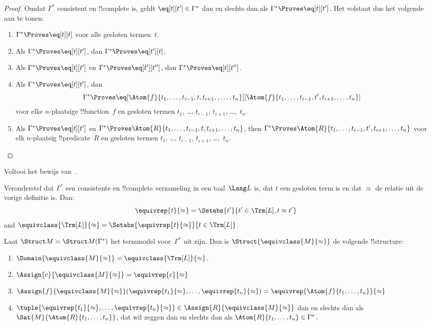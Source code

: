 \documentclass[../../../include/open-logic-section]{subfiles}
\begin{document}
\begin{proof}
Omdat $\Gamma^*$ consistent en !!{complete} is, geldt
$\eq[t][t'] \in \Gamma^*$ dan en slechts dan als
$\Gamma^* \Proves \eq[t][t']$. Het volstaat dus het volgende aan te tonen:
\begin{enumerate}
\item $\Gamma^* \Proves \eq[t][t]$ voor alle gesloten termen~$t$.
\item Als $\Gamma^* \Proves \eq[t][t']$, dan $\Gamma^* \Proves \eq[t'][t]$.
\item Als $\Gamma^* \Proves \eq[t][t']$ en $\Gamma^* \Proves
  \eq[t'][t'']$, dan $\Gamma^* \Proves \eq[t][t'']$.
\item Als $\Gamma^* \Proves \eq[t][t']$, dan
\[
\Gamma^* \Proves
\eq[\Atom{f}{t_1,\dots,t_{i-1},t,t_{i+1},,\dots,t_n}][\Atom{f}{t_1,\dots,t_{i-1},t',t_{i+1},\dots,t_n}]
\]
voor elke $n$-plaatsige !!{function}~$f$ en gesloten termen $t_1$, \dots,
$t_{i-1}$, $t_{i+1}$, \dots,~$t_n$.
\item Als $\Gamma^* \Proves \eq[t][t']$ en
$\Gamma^* \Proves
\Atom{R}{t_1,\dots,t_{i-1},t,t_{i+1},\dots,t_n}$, then
$\Gamma^* \Proves \Atom{R}{t_1,\dots,t_{i-1},t',t_{i+1},\dots,t_n}$
voor elk $n$-plaatsig !!{predicate}~$R$ en gesloten termen $t_1$, \dots,
$t_{i-1}$, $t_{i+1}$, \dots,~$t_n$.
\end{enumerate}
\end{proof}

\begin{prob}
Voltooi het bewijs van~.
\end{prob}

\begin{defn}
Veronderstel dat $\Gamma^*$ een consistente en !!{complete} verzameling
in een taal~$\Lang L$ is, dat $t$ een gesloten term is en dat $\approx$
de relatie uit de vorige definitie is. Dan:
\[
\equivrep{t}{\approx} = \Setabs{t'}{t'\in \Trm[L], t \approx t'}
\]
and $\equivclass{\Trm[L]}{\approx} = \Setabs{\equivrep{t}{\approx}}{t \in \Trm[L]}$.
\end{defn}

\begin{defn}
Laat $\Struct M = \Struct M(\Gamma^*)$ het termmodel voor~$\Gamma^*$ uit
 zijn. Dan is
$\Struct{\equivclass{M}{\approx}}$ de volgende !!{structure}:
\begin{enumerate}
\item $\Domain{\equivclass{M}{\approx}} = \equivclass{\Trm[L]}{\approx}$.
\item $\Assign{c}{\equivclass{M}{\approx}} = \equivrep{c}{\approx}$
\item $\Assign{f}{\equivclass{M}{\approx}}(\equivrep{t_1}{\approx}, \dots,
  \equivrep{t_n}{\approx}) = \equivrep{\Atom{f}{t_1,\dots, t_n}}{\approx}$
\item $\tuple{\equivrep{t_1}{\approx}, \dots, \equivrep{t_n}{\approx}} \in
  \Assign{R}{\equivclass{M}{\approx}}$ dan en slechts dan als
  $\Sat{M}{\Atom{R}{t_1,\dots, t_n}}$, dat wil zeggen dan en slechts dan
  als $\Atom{R}{t_1,\dots,
  t_n} \in \Gamma^*$.
\end{enumerate}
\end{defn}
\end{document}
